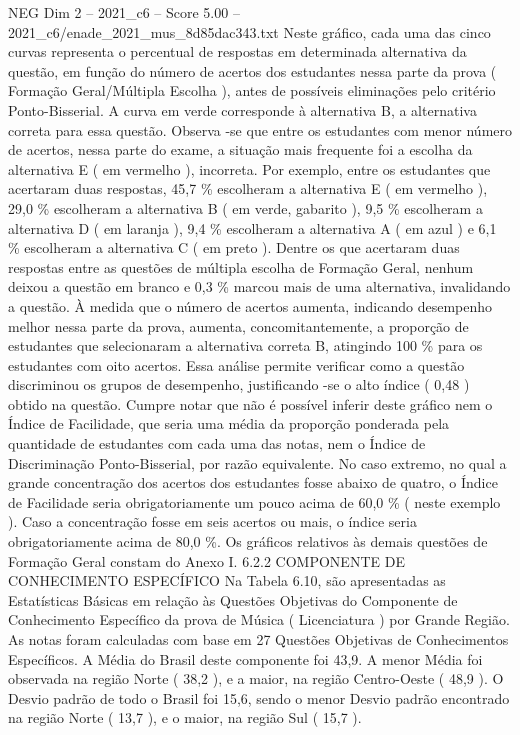 \begin{textsample}{NEG Dim 2 – 2021\_c6 – Score 5.00 – 2021\_c6/enade\_2021\_mus\_8d85dac343.txt}
Neste gráfico, cada uma das cinco curvas representa o percentual de respostas em determinada alternativa da questão, em função do número de acertos dos estudantes nessa parte da prova ( Formação Geral/Múltipla Escolha ), antes de possíveis eliminações pelo critério Ponto-Bisserial.
A curva em verde corresponde à alternativa B, a alternativa correta para essa questão.
Observa -se que entre os estudantes com menor número de acertos, nessa parte do exame, a situação mais frequente foi a escolha da alternativa E ( em vermelho ), incorreta.
Por exemplo, entre os estudantes que acertaram duas respostas, 45,7 \% escolheram a alternativa E ( em vermelho ), 29,0 \% escolheram a alternativa B ( em verde, gabarito ), 9,5 \% escolheram a alternativa D ( em laranja ), 9,4 \% escolheram a alternativa A ( em azul ) e 6,1 \% escolheram a alternativa C ( em preto ).
Dentre os que acertaram duas respostas entre as questões de múltipla escolha de Formação Geral, nenhum deixou a questão em branco e 0,3 \% marcou mais de uma alternativa, invalidando a questão.
À medida que o número de acertos aumenta, indicando desempenho melhor nessa parte da prova, aumenta, concomitantemente, a proporção de estudantes que selecionaram a alternativa correta B, atingindo 100 \% para os estudantes com oito acertos.
Essa análise permite verificar como a questão discriminou os grupos de desempenho, justificando -se o alto índice ( 0,48 ) obtido na questão.
Cumpre notar que não é possível inferir deste gráfico nem o Índice de Facilidade, que seria uma média da proporção ponderada pela quantidade de estudantes com cada uma das notas, nem o Índice de Discriminação Ponto-Bisserial, por razão equivalente.
No caso extremo, no qual a grande concentração dos acertos dos estudantes fosse abaixo de quatro, o Índice de Facilidade seria obrigatoriamente um pouco acima de 60,0 \% ( neste exemplo ).
Caso a concentração fosse em seis acertos ou mais, o índice seria obrigatoriamente acima de 80,0 \%.
Os gráficos relativos às demais questões de Formação Geral constam do Anexo I. 6.2.2 COMPONENTE DE CONHECIMENTO ESPECÍFICO Na Tabela 6.10, são apresentadas as Estatísticas Básicas em relação às Questões Objetivas do Componente de Conhecimento Específico da prova de Música ( Licenciatura ) por Grande Região.
As notas foram calculadas com base em 27 Questões Objetivas de Conhecimentos Específicos.
A Média do Brasil deste componente foi 43,9.
A menor Média foi observada na região Norte ( 38,2 ), e a maior, na região Centro-Oeste ( 48,9 ).
O Desvio padrão de todo o Brasil foi 15,6, sendo o menor Desvio padrão encontrado na região Norte ( 13,7 ), e o maior, na região Sul ( 15,7 ).

\end{textsample}
